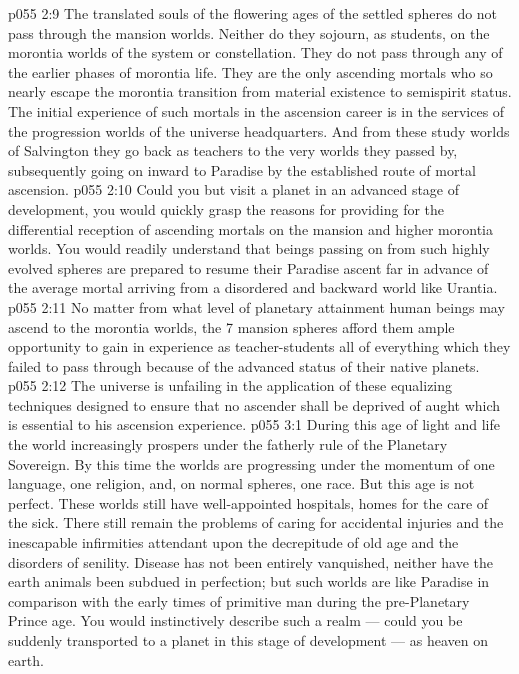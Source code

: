 \vs p055 2:9 \pc The translated souls of the flowering ages of the settled spheres do not pass through the mansion worlds. Neither do they sojourn, as students, on the morontia worlds of the system or constellation. They do not pass through any of the earlier phases of morontia life. They are the only ascending mortals who so nearly escape the morontia transition from material existence to semispirit status. The initial experience of such  mortals in the ascension career is in the services of the progression worlds of the universe headquarters. And from these study worlds of Salvington they go back as teachers to the very worlds they passed by, subsequently going on inward to Paradise by the established route of mortal ascension.
\vs p055 2:10 Could you but visit a planet in an advanced stage of development, you would quickly grasp the reasons for providing for the differential reception of ascending mortals on the mansion and higher morontia worlds. You would readily understand that beings passing on from such highly evolved spheres are prepared to resume their Paradise ascent far in advance of the average mortal arriving from a disordered and backward world like Urantia.
\vs p055 2:11 No matter from what level of planetary attainment human beings may ascend to the morontia worlds, the 7 mansion spheres afford them ample opportunity to gain in experience as teacher\hyp{}students all of everything which they failed to pass through because of the advanced status of their native planets.
\vs p055 2:12 The universe is unfailing in the application of these equalizing techniques designed to ensure that no ascender shall be deprived of aught which is essential to his ascension experience.
\vs p055 3:1 During this age of light and life the world increasingly prospers under the fatherly rule of the Planetary Sovereign. By this time the worlds are progressing under the momentum of one language, one religion, and, on normal spheres, one race. But this age is not perfect. These worlds still have well\hyp{}appointed hospitals, homes for the care of the sick. There still remain the problems of caring for accidental injuries and the inescapable infirmities attendant upon the decrepitude of old age and the disorders of senility. Disease has not been entirely vanquished, neither have the earth animals been subdued in perfection; but such worlds are like Paradise in comparison with the early times of primitive man during the pre\hyp{}Planetary Prince age. You would instinctively describe such a realm --- could you be suddenly transported to a planet in this stage of development --- as heaven on earth.
